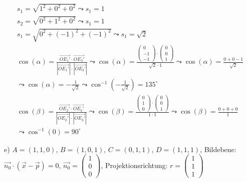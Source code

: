 \begin{gather}
	s_1 = \sqrt{1^2+0^2+0^2} \leadsto s_1 = 1\\
	s_2 = \sqrt{0^2+1^2+0^2} \leadsto s_1 = 1\\
	s_1 = \sqrt{0^2+(-1)^2+(-1)^2} \leadsto s_1 = \sqrt{2}\\
	\cos(\alpha)= \frac{\overrightarrow{OE_1'} \cdot \overrightarrow{OE_3'}}{|\overrightarrow{OE_1'}|\cdot |\overrightarrow{OE_3'}|} 
	\leadsto
		\cos(\alpha)= \frac{\begin{pmatrix}
		0\\-1\\-1
		\end{pmatrix}\cdot \begin{pmatrix}
		0\\0\\1
		\end{pmatrix}}{\sqrt{2} \cdot 1}
	\leadsto
		\cos(\alpha)= \frac{0+0-1}{\sqrt{2}}\\ \leadsto 	\cos(\alpha)= -\frac{1}{\sqrt{2}} \leadsto \cos^{-1}(-\frac{1}{\sqrt{2}}) = 135^{\circ}\\		
	\cos(\beta)= \frac{\overrightarrow{OE_2'} \cdot \overrightarrow{OE_3'}}{|\overrightarrow{OE_2'}|\cdot |\overrightarrow{OE_3'}|} 
		\leadsto
		\cos(\beta)= \frac{\begin{pmatrix}
			0\\1\\0
			\end{pmatrix}\cdot \begin{pmatrix}
			0\\0\\1
			\end{pmatrix}}{1 \cdot 1}
	\leadsto
		\cos(\beta)= \frac{0+0+0}{1}\\ \leadsto  \cos^{-1}(0) = 90^{\circ}	
\end{gather}

e) \ensuremath{A = (1,1,0)}, \ensuremath{B=(1,0,1)}, \ensuremath{C=(0,1,1)}, \ensuremath{ D=(1,1,1)}, Bildebene: \ensuremath{\vec{n_0} \cdot (\vec{x}-\vec{p})=0}, 
\ensuremath{\vec{n_0} = \begin{pmatrix}
		1\\0\\0
\end{pmatrix}}, Projektionsrichtung: \ensuremath{r = \begin{pmatrix}
1\\1\\1
\end{pmatrix}}

